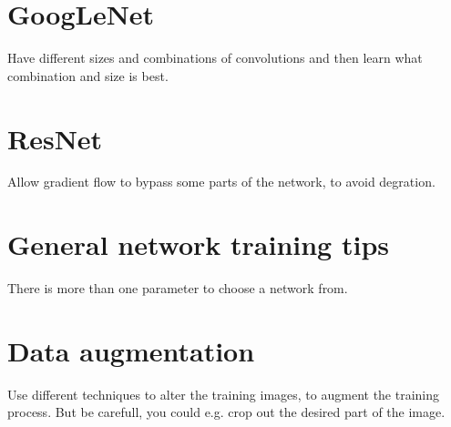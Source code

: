 \documentclass[a4paper]{article}
\begin{document}
\section{GoogLeNet}
Have different sizes and combinations of convolutions and then learn what combination and size is best. 

\section{ResNet}
Allow gradient flow to bypass some parts of the network, to avoid degration. 


\section{General network training tips}
There is more than one parameter to choose a network from. 

\section{Data augmentation}
Use different techniques to alter the training images, to augment the training process. But be carefull, you could e.g. crop out the desired part of the image. 
\end{document}
